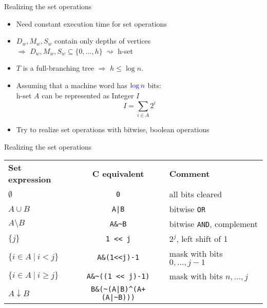 \documentclass[18pt]{beamer}
\begin{document}
\begin{frame}{Realizing the set operations}
	\begin{itemize}
		\item Need constant execution time for {\color{blue}set operations}
		\bigskip
		\item $D_w, M_w, S_w$ contain only depths of vertices \\
			 $\Rightarrow$ $D_w, M_w, S_w \subseteq \{0,...,h\} \ \rightsquigarrow$ {\color{blue} h-set}
		\bigskip
		\item $T$ is a full-branching tree $\Rightarrow$ $h \le \log n$. 
		\bigskip
		\item Assuming that a machine word has $\color{blue} \log n$ bits: \\
			  h-set $A$ can be represented as Integer $I$
			  \[ I = \sum_{i\in A} 2^i \]
		\item Try to realize set operations with bitwise, boolean operations
		
	\end{itemize}
\end{frame}
\begin{frame}{Realizing the set operations}
	
	\begin{tabular}[]{ l c l }
		\textbf{Set expression} & \textbf{C equivalent} & \textbf{Comment} \\
		$\emptyset$ & \texttt{0} & all bits cleared \\
		$A \cup B$ & \texttt{A|B} & bitwise \texttt{OR} \\
		$A \setminus B$ & \texttt{A\&\textasciitilde B}  & bitwise \texttt{AND}, complement \\
		$\{j\}$ & \texttt{1 << j} & $2^j$, left shift of 1 \\
		$\{i \in A \ | \ i < j \}$ & \texttt{A\&(1<<j)-1} & mask with bits $0,\dots,j-1$\\
		$\{i\in A \ | \ i \ge j \} $ & \texttt{A\&\textasciitilde((1 << j)-1)}	& mask with bits $n,\dots,j$ \\
		$A \downarrow B$ & \texttt{B\&(\textasciitilde(A|B)\^{}(A+(A|\textasciitilde B)))}
	\end{tabular}
 \end{frame}
\end{document}
